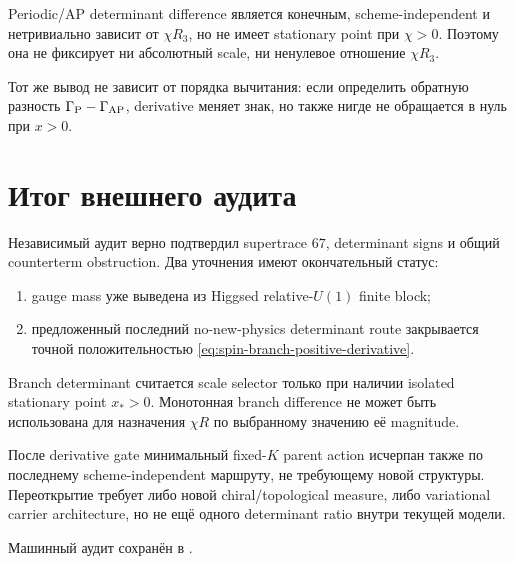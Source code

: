\begin{theorem}
Periodic/AP determinant difference является конечным, scheme-independent и
нетривиально зависит от \(\chi R_3\), но не имеет stationary point при
\(\chi>0\). Поэтому она не фиксирует ни абсолютный scale, ни ненулевое
отношение \(\chi R_3\).
\end{theorem}

Тот же вывод не зависит от порядка вычитания: если определить обратную
разность \(\Gamma_{\rm P}-\Gamma_{\rm AP}\), derivative меняет знак, но
также нигде не обращается в нуль при \(x>0\).

\section{Итог внешнего аудита}

Независимый аудит верно подтвердил supertrace \(67\), determinant signs и
общий counterterm obstruction. Два уточнения имеют окончательный статус:
\begin{enumerate}
 \item gauge mass уже выведена из Higgsed relative-\(U(1)\) finite block;
 \item предложенный последний no-new-physics determinant route закрывается
 точной положительностью \eqref{eq:spin-branch-positive-derivative}.
\end{enumerate}

\begin{nogocriterion}
Branch determinant считается scale selector только при наличии isolated
stationary point \(x_*>0\). Монотонная branch difference не может быть
использована для назначения \(\chi R\) по выбранному значению её magnitude.
\end{nogocriterion}

\begin{theorem}
После derivative gate минимальный fixed-\(K\) parent action исчерпан также
по последнему scheme-independent маршруту, не требующему новой структуры.
Переоткрытие требует либо новой chiral/topological measure, либо
variational carrier architecture, но не ещё одного determinant ratio внутри
текущей модели.
\end{theorem}

Машинный аудит сохранён в
.